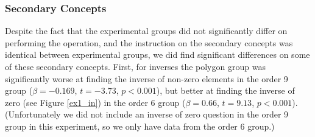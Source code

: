 \documentclass[11pt]{article}
\begin{document}
\subsubsection{Secondary Concepts}
Despite the fact that the experimental groups did not significantly differ on performing the operation, and the instruction on the secondary concepts was identical between experimental groups, we did find significant differences on some of these secondary concepts. First, for inverses the polygon group was significantly worse at finding the inverse of non-zero elements in the order 9 group ($\beta = -0.169$, $t=-3.73$, $p < 0.001$), but better at finding the inverse of zero (see Figure \ref{ex1_in}) in the order 6 group ($\beta = 0.66$, $t=9.13$, $p < 0.001$). (Unfortunately we did not include an inverse of zero question in the order 9 group in this experiment, so we only have data from the order 6 group.)
\end{document}
